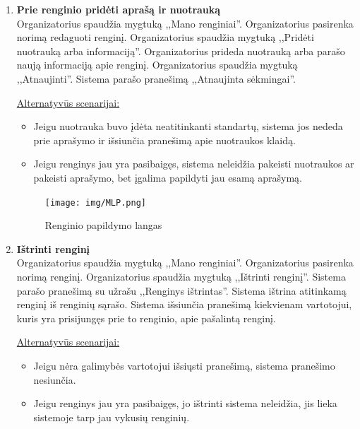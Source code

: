 \documentclass{VUMIFPSkursinis}
\begin{document}
\begin{enumerate} [label = \textbf{U\arabic*.}]
				\begin{figure}[H]
					\centering
					\texttt{[image: img/MLP.png]}
					\caption{Atsakingo asmens paskyrimo langas}
					\label{fig:paskirti-atsakinga-asmeni}
				\end{figure}
				
			\item \textbf{Prie renginio pridėti aprašą ir nuotrauką} \\
				Organizatorius spaudžia mygtuką ,,Mano renginiai''. 
				Organizatorius pasirenka norimą redaguoti renginį.
				Organizatorius spaudžia mygtuką ,,Pridėti nuotrauką arba informaciją''. 
				Organizatorius prideda nuotrauką arba parašo naują informaciją apie renginį.
				Organizatorius spaudžia mygtuką ,,Atnaujinti''. 
				Sistema parašo pranešimą ,,Atnaujinta sėkmingai''.
				
				\underline{Alternatyvūs scenarijai:}
				\begin{itemize}
					\item Jeigu nuotrauka buvo įdėta neatitinkanti standartų, sistema jos nededa prie aprašymo ir išsiunčia pranešimą apie nuotraukos klaidą.
					\item Jeigu renginys jau yra pasibaigęs, sistema neleidžia pakeisti nuotraukos ar pakeisti aprašymo, bet įgalima papildyti jau esamą aprašymą.
				\end{itemize}
				
				\begin{figure}[H]
					\centering
					\texttt{[image: img/MLP.png]}
					\caption{Renginio papildymo langas}
					\label{fig:prideti-aprasa}
				\end{figure}
				
			\item \textbf{Ištrinti renginį} \\
				Organizatorius spaudžia mygtuką ,,Mano renginiai''. 
				Organizatorius pasirenka norimą renginį.
				Organizatorius spaudžia mygtuką ,,Ištrinti renginį''. 
				Sistema parašo pranešimą su užrašu ,,Renginys ištrintas''. 
				Sistema ištrina atitinkamą renginį iš renginių sąrašo.
				Sistema išsiunčia pranešimą kiekvienam vartotojui, kuris yra prisijungęs prie to renginio, apie pašalintą renginį.
				
				\underline{Alternatyvūs scenarijai:}
				\begin{itemize}
					\item Jeigu nėra galimybės vartotojui išsiųsti pranešimą, sistema pranešimo nesiunčia.
					\item Jeigu renginys jau yra pasibaigęs, jo ištrinti sistema neleidžia, jis lieka sistemoje tarp jau vykusių renginių.
				\end{itemize}
				

\end{enumerate}
\end{document}
